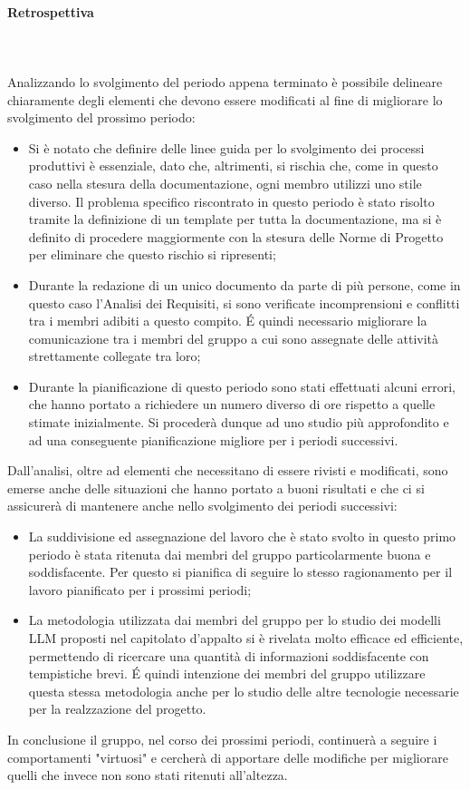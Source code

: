\paragraph{Retrospettiva} \hspace{1cm} 
\\ \hspace{1cm} \\
Analizzando lo svolgimento del periodo appena terminato è possibile delineare chiaramente degli elementi che devono essere modificati al fine di migliorare lo svolgimento del prossimo periodo:
\begin{itemize}
    \item Si è notato che definire delle linee guida per lo svolgimento dei processi produttivi è essenziale, dato che, altrimenti, si rischia che, come in questo caso nella stesura della documentazione, ogni membro utilizzi uno stile diverso. Il problema specifico riscontrato in questo periodo è stato risolto tramite la definizione di un template per tutta la documentazione, ma si è definito di procedere maggiormente con la stesura delle Norme di Progetto per eliminare che questo rischio si ripresenti;
    \item Durante la redazione di un unico documento da parte di più persone, come in questo caso l'Analisi dei Requisiti, si sono verificate incomprensioni e conflitti tra i membri adibiti a questo compito. \'E quindi necessario migliorare la comunicazione tra i membri del gruppo a cui sono assegnate delle attività strettamente collegate tra loro;
    \item Durante la pianificazione di questo periodo sono stati effettuati alcuni errori, che hanno portato a richiedere un numero diverso di ore rispetto a quelle stimate inizialmente. Si procederà dunque ad uno studio più approfondito e ad una conseguente pianificazione migliore per i periodi successivi.
\end{itemize}
Dall'analisi, oltre ad elementi che necessitano di essere rivisti e modificati, sono emerse anche delle situazioni che hanno portato a buoni risultati e che ci si assicurerà di mantenere anche nello svolgimento dei periodi successivi:
\begin{itemize}
    \item La suddivisione ed assegnazione del lavoro che è stato svolto in questo primo periodo è stata ritenuta dai membri del gruppo particolarmente buona e soddisfacente. Per questo si pianifica di seguire lo stesso ragionamento per il lavoro pianificato per i prossimi periodi;
    \item La metodologia utilizzata dai membri del gruppo per lo studio dei modelli LLM proposti nel capitolato d'appalto si è rivelata molto efficace ed efficiente, permettendo di ricercare una quantità di informazioni soddisfacente con tempistiche brevi. \'E quindi intenzione dei membri del gruppo utilizzare questa stessa metodologia anche per lo studio delle altre tecnologie necessarie per la realzzazione del progetto.
\end{itemize}
In conclusione il gruppo, nel corso dei prossimi periodi, continuerà a seguire i comportamenti "virtuosi" e cercherà di apportare delle modifiche per migliorare quelli che invece non sono stati ritenuti all'altezza.

